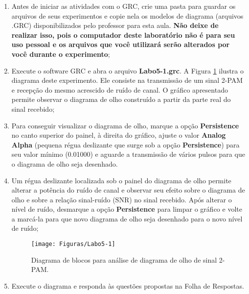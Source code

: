 \documentclass[12pt,addpoints]{exam}
\begin{document}
\begin{enumerate}
    \item Antes de iniciar as atividades com o GRC, crie uma pasta para guardar os arquivos de seus experimentos e copie nela os modelos de diagrama (arquivos .GRC) disponibilizados pelo professor para esta aula. \textbf{Não deixe de realizar isso, pois o computador deste laboratório não é para seu uso pessoal e os arquivos que você utilizará serão alterados por você durante o experimento};
    \item Execute o software GRC e abra o arquivo \textbf{Labo5-1.grc}. A Figura \ref{fig:GRC_5-1} ilustra o diagrama deste experimento. Ele consiste na transmissão de um sinal 2-PAM e recepção do mesmo acrescido de ruído de canal. O gráfico apresentado permite observar o diagrama de olho construído a partir da parte real do sinal recebido;
    \item Para conseguir visualizar o diagrama de olho, marque a opção \textbf{Persistence} no canto superior do painel, à direita do gráfico, ajuste o valor \textbf{Analog Alpha} (pequena régua deslizante que surge sob a opção \textbf{Persistence}) para seu valor mínimo (0.01000) e aguarde a transmissão de vários pulsos para que o diagrama de olho seja desenhado. 
    \item Um régua deslizante localizada sob o painel do diagrama de olho permite alterar a potência do ruído de canal e observar seu efeito sobre o diagrama de olho e sobre a relação sinal-ruído (SNR) no sinal recebido. Após alterar o nível de ruído, desmarque a opção \textbf{Persistence} para limpar o gráfico e volte a marcá-la para que novo diagrama de olho seja desenhado para o novo nível de ruído;
    \begin{figure}[htb]
        \centering
        \texttt{[image: Figuras/Labo5-1]}
        \caption{Diagrama de blocos para análise de diagrama de olho de sinal 2-PAM.}
        \label{fig:GRC_5-1}
    \end{figure}
  \item Execute o diagrama e responda às questões propostas na Folha de Respostas.
\end{enumerate}
\end{document}
